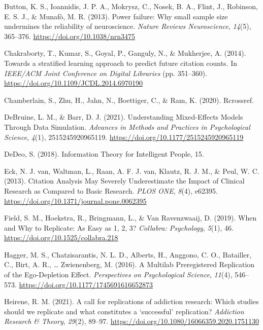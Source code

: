 \documentclass[
  english,
  jou,floatsintext]{apa6}
\newlength{\cslhangindent}
\newlength{\cslentryspacingunit} %
\newenvironment{CSLReferences}[2] %
 {%
  \setlength{\parindent}{0pt}
  \ifodd #1
  \let\oldpar\par
  \def\par{\hangindent=\cslhangindent\oldpar}
  \fi
  \setlength{\parskip}{#2\cslentryspacingunit}
 }%
 {}
\begin{document}
\begin{CSLReferences}{1}{0}
\leavevmode{}%
Button, K. S., Ioannidis, J. P. A., Mokrysz, C., Nosek, B. A., Flint, J., Robinson, E. S. J., \& Munafò, M. R. (2013). Power failure: Why small sample size undermines the reliability of neuroscience. \emph{Nature Reviews Neuroscience}, \emph{14}(5), 365--376. \url{https://doi.org/10.1038/nrn3475}

\leavevmode{}%
Chakraborty, T., Kumar, S., Goyal, P., Ganguly, N., \& Mukherjee, A. (2014). Towards a stratified learning approach to predict future citation counts. In \emph{{IEEE}/{ACM Joint Conference} on {Digital Libraries}} (pp. 351--360). \url{https://doi.org/10.1109/JCDL.2014.6970190}

\leavevmode{}%
Chamberlain, S., Zhu, H., Jahn, N., Boettiger, C., \& Ram, K. (2020). Rcrossref.

\leavevmode{}%
DeBruine, L. M., \& Barr, D. J. (2021). Understanding {Mixed}-{Effects Models Through Data Simulation}. \emph{Advances in Methods and Practices in Psychological Science}, \emph{4}(1), 2515245920965119. \url{https://doi.org/10.1177/2515245920965119}

\leavevmode{}%
DeDeo, S. (2018). Information {Theory} for {Intelligent People}, 15.

\leavevmode{}%
Eck, N. J. van, Waltman, L., Raan, A. F. J. van, Klautz, R. J. M., \& Peul, W. C. (2013). Citation {Analysis May Severely Underestimate} the {Impact} of {Clinical Research} as {Compared} to {Basic Research}. \emph{PLOS ONE}, \emph{8}(4), e62395. \url{https://doi.org/10.1371/journal.pone.0062395}

\leavevmode{}%
Field, S. M., Hoekstra, R., Bringmann, L., \& Van Ravenzwaaij, D. (2019). When and {Why} to {Replicate}: {As Easy} as 1, 2, 3? \emph{Collabra: Psychology}, \emph{5}(1), 46. \url{https://doi.org/10.1525/collabra.218}

\leavevmode{}%
Hagger, M. S., Chatzisarantis, N. L. D., Alberts, H., Anggono, C. O., Batailler, C., Birt, A. R., \ldots{} Zwienenberg, M. (2016). A {Multilab Preregistered Replication} of the {Ego}-{Depletion Effect}. \emph{Perspectives on Psychological Science}, \emph{11}(4), 546--573. \url{https://doi.org/10.1177/1745691616652873}

\leavevmode{}%
Heirene, R. M. (2021). A call for replications of addiction research: Which studies should we replicate and what constitutes a {`successful'} replication? \emph{Addiction Research \& Theory}, \emph{29}(2), 89--97. \url{https://doi.org/10.1080/16066359.2020.1751130}


\end{CSLReferences}
\end{document}
